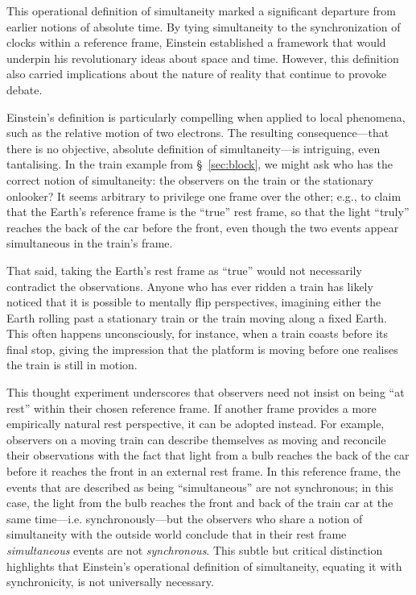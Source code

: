 \documentclass[aps,rmp,groupedaddress,twocolumn,10pt]{revtex4-2}
\begin{document}
This operational definition of simultaneity marked a significant departure from earlier notions of absolute time. By tying simultaneity to the synchronization of clocks within a reference frame, Einstein established a framework that would underpin his revolutionary ideas about space and time. However, this definition also carried implications about the nature of reality that continue to provoke debate.

Einstein's definition is particularly compelling when applied to local phenomena, such as the relative motion of two electrons. The resulting consequence---that there is no objective, absolute definition of simultaneity---is intriguing, even tantalising. In the train example from \S~\ref{sec:block}, we might ask who has the correct notion of simultaneity: the observers on the train or the stationary onlooker? It seems arbitrary to privilege one frame over the other; e.g., to claim that the Earth's reference frame is the ``true'' rest frame, so that the light ``truly'' reaches the back of the car before the front, even though the two events appear simultaneous in the train's frame.

That said, taking the Earth's rest frame as ``true'' would not necessarily contradict the observations. Anyone who has ever ridden a train has likely noticed that it is possible to mentally flip perspectives, imagining either the Earth rolling past a stationary train or the train moving along a fixed Earth. This often happens unconsciously, for instance, when a train coasts before its final stop, giving the impression that the platform is moving before one realises the train is still in motion.

This thought experiment underscores that observers need not insist on being ``at rest'' within their chosen reference frame. If another frame provides a more empirically natural rest perspective, it can be adopted instead. For example, observers on a moving train can describe themselves as moving and reconcile their observations with the fact that light from a bulb reaches the back of the car before it reaches the front in an external rest frame.  In this reference frame, the events that are described as being ``simultaneous'' are not synchronous; in this case, the light from the bulb reaches the front and back of the train car at the same time---i.e. synchronously---but the observers who share a notion of simultaneity with the outside world conclude that in their rest frame \textit{simultaneous} events are not \textit{synchronous}. This subtle but critical distinction highlights that Einstein's operational definition of simultaneity, equating it with synchronicity, is not universally necessary.
\end{document}
